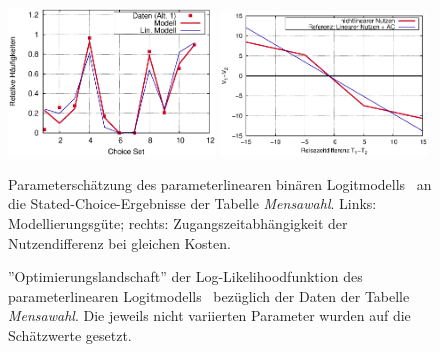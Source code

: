 \begin{figure}
 \includegraphics[width=0.49\textwidth]
   {figsDiscr/nonlinUtility_statedChoiceWS1213_quasi_fProb.eps}
 \includegraphics[width=0.49\textwidth]
   {figsDiscr/nonlinUtility_statedChoiceWS1213_quasi_Vfun.eps}
  \caption{\label{fig:mensaQuasi}Parametersch\"atzung des
    parameterlinearen bin\"aren Logitmodells~ an die
    Stated-Choice-Ergebnisse der Tabelle \emph{Mensawahl}. Links:
    Modellierungsg\"ute; rechts: Zugangszeitabh\"angigkeit der 
Nutzendifferenz bei gleichen Kosten.
}
\end{figure}

\begin{figure}
  \caption{\label{fig:mensaQuasiCorr}''Optimierungslandschaft'' der
    Log-Likelihoodfunktion  des
    parameterlinearen Logitmodells~ bez\"uglich der
    Daten der Tabelle \emph{Mensawahl}. Die jeweils nicht variierten
    Parameter wurden auf die Sch\"atzwerte gesetzt.
}
\end{figure}

